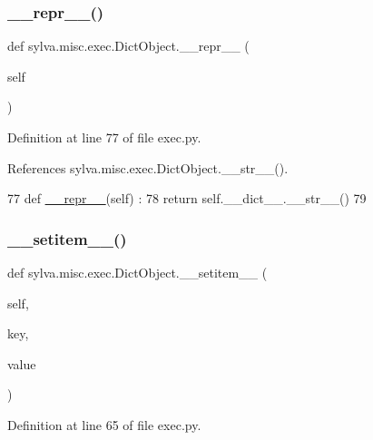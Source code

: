 \subsubsection{\texorpdfstring{\+\_\+\+\_\+repr\+\_\+\+\_\+()}{\_\_repr\_\_()}}
{\footnotesize\ttfamily def sylva.\+misc.\+exec.\+Dict\+Object.\+\_\+\+\_\+repr\+\_\+\+\_\+ (\begin{DoxyParamCaption}\item[{}]{self }\end{DoxyParamCaption})\hspace{0.3cm}{\ttfamily [inherited]}}



Definition at line 77 of file exec.\+py.



References sylva.\+misc.\+exec.\+Dict\+Object.\+\_\+\+\_\+str\+\_\+\+\_\+().


\begin{DoxyCode}
77   \textcolor{keyword}{def }\hyperlink{namespacesylva_1_1code__generation_1_1floorplanner_a84f24b1e40f5425e9bb40ab45ccbd10f}{\_\_repr\_\_}(self) :
78     \textcolor{keywordflow}{return} self.\_\_dict\_\_.\_\_str\_\_()
79 
\end{DoxyCode}
\mbox{\label{classsylva_1_1misc_1_1exec_1_1_dict_object_a219a0c8ab7c1f0a05a76c5c79f86fe59}} 
\subsubsection{\texorpdfstring{\+\_\+\+\_\+setitem\+\_\+\+\_\+()}{\_\_setitem\_\_()}}
{\footnotesize\ttfamily def sylva.\+misc.\+exec.\+Dict\+Object.\+\_\+\+\_\+setitem\+\_\+\+\_\+ (\begin{DoxyParamCaption}\item[{}]{self,  }\item[{}]{key,  }\item[{}]{value }\end{DoxyParamCaption})\hspace{0.3cm}{\ttfamily [inherited]}}



Definition at line 65 of file exec.\+py.



